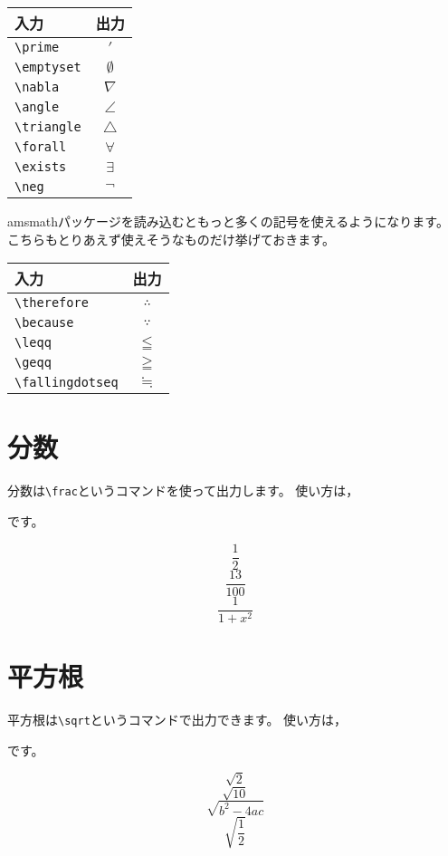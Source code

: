 \documentclass[class=jreport, crop=false, preview=false, dvipdfmx, fleqn]{standalone}
\begin{document}
\begin{minipage}{0.25\hsize}
\begin{tabular}{lc}
入力 & 出力 \\ \hline
\verb|\prime| & $\prime$ \\
\verb|\emptyset| & $\emptyset$ \\
\verb|\nabla| & $\nabla$ \\
\verb|\angle| & $\angle$ \\
\verb|\triangle| & $\triangle$ \\
\verb|\forall| & $\forall$ \\
\verb|\exists| & $\exists$ \\
\verb|\neg| & $\neg$ \\
\end{tabular}
\end{minipage}

amsmathパッケージを読み込むともっと多くの記号を使えるようになります。
こちらもとりあえず使えそうなものだけ挙げておきます。

\begin{tabular}{lc}
入力 & 出力 \\ \hline
\verb|\therefore| & $\therefore$ \\
\verb|\because| & $\because$ \\
\verb|\leqq| & $\leqq$ \\
\verb|\geqq| & $\geqq$ \\
\verb|\fallingdotseq| & $\fallingdotseq$ \\
\end{tabular}




\section{分数}
分数は\verb|\frac|というコマンドを使って出力します。
使い方は，
\begin{ITeX}
\end{ITeX}
です。
\begin{IOTeX}
\[ \frac{1}{2} \]
\[ \frac{13}{100} \]
\[ \frac{1}{1 + x^2} \]
\end{IOTeX}



\section{平方根}
平方根は\verb|\sqrt|というコマンドで出力できます。
使い方は，
\begin{ITeX}
\end{ITeX}
です。
\begin{IOTeX}
\[ \sqrt{2} \]
\[ \sqrt{10} \]
\[ \sqrt{b^2 - 4ac} \]
\[ \sqrt{\frac{1}{2}} \]
\end{IOTeX}
\end{document}
